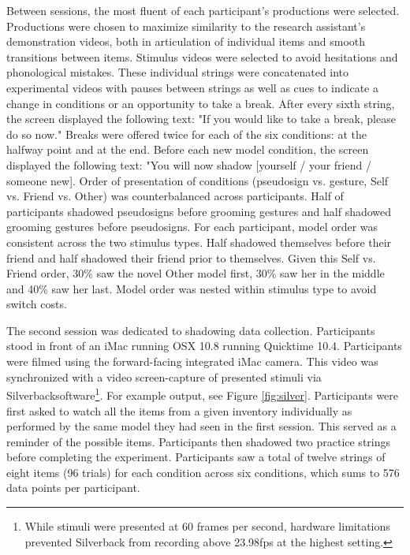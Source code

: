             Between sessions, the most fluent of each participant’s productions were selected. Productions were chosen to maximize similarity to the research assistant’s demonstration videos, both in articulation of individual items and smooth transitions between items. Stimulus videos were selected to avoid hesitations and phonological mistakes. These individual strings were concatenated into experimental videos with pauses between strings as well as cues to indicate a change in conditions or an opportunity to take a break. After every sixth string, the screen displayed the following text: "If you would like to take a break, please do so now." Breaks were offered twice for each of the six conditions: at the halfway point and at the end. Before each new model condition, the screen displayed the following text: "You will now shadow [yourself / your friend / someone new]. Order of presentation of conditions (pseudosign vs. gesture, Self vs. Friend vs. Other) was counterbalanced across participants. Half of participants shadowed pseudosigns before grooming gestures and half shadowed grooming gestures before pseudosigns. For each participant, model order was consistent across the two stimulus types. Half shadowed themselves before their friend and half shadowed their friend prior to themselves. Given this Self vs. Friend order, 30\% saw the novel Other model first, 30\% saw her in the middle and 40\% saw her last. Model order was nested within stimulus type to avoid switch costs. \par 
            The second session was dedicated to shadowing data collection. Participants stood in front of an iMac running OSX 10.8 running Quicktime 10.4. Participants were filmed using the forward-facing integrated iMac camera. This video was synchronized with a video screen-capture of presented stimuli via Silverback\txreg software\footnote{While stimuli were presented at 60 frames per second, hardware limitations prevented Silverback from recording above 23.98fps at the highest setting.}. For example output, see Figure \ref{fig:silver}. Participants were first asked to watch all the items from a given inventory individually as performed by the same model they had seen in the first session. This served as a reminder of the possible items. Participants then shadowed two practice strings before completing the experiment. Participants saw a total of twelve strings of eight items (96 trials) for each condition across six conditions, which sums to 576 data points per participant. \par

